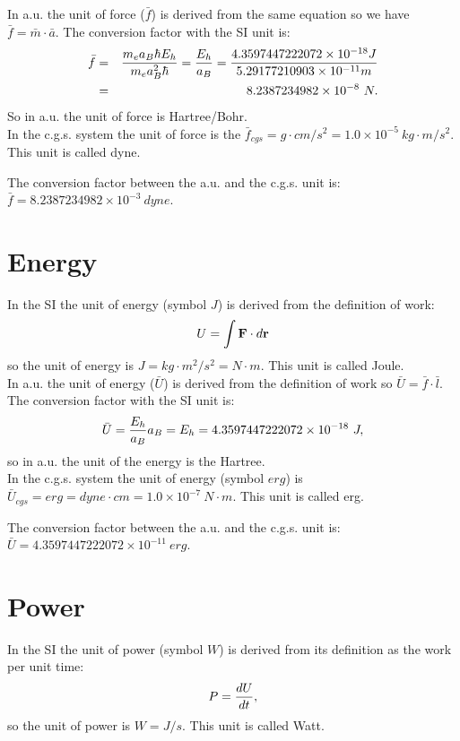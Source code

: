 \documentclass[12pt,a4paper]{article}
\def\barl{5.29177210903\times 10^{-11}}
\def\barf{8.2387234982\times 10^{-8}}
\def\baru{4.3597447222072\times 10^{-18}}
\def\ftof{1.0\times 10^{-5}}
\def\utou{1.0\times 10^{-7}}
\def\barfcgs{8.2387234982\times 10^{-3}}
\def\barucgs{4.3597447222072\times 10^{-11}}
\begin{document}
{\color{web-blue} In a.u. the unit of force ($\bar f$) is derived 
from the same equation so we have $\bar f =\bar m \cdot \bar a$. The
conversion factor with the SI unit is: 
\begin{eqnarray}
\bar f &=& {m_e a_B \hbar E_h \over m_e a_B^2 \hbar }= 
{E_h\over a_B}\nonumber={\baru J \over \barl m}\nonumber \\
&=&\barf\ N. 
\end{eqnarray}
So in a.u. the unit of force is Hartree/Bohr.
}
\\

{\color{orange} In the c.g.s. system the unit of force is the 
$\bar f_{cgs}=g\cdot cm/s^2 = \ftof\ kg\cdot m/s^2$. This unit is 
called dyne.
\\
}

{\color{green} The conversion factor between the a.u. and the c.g.s. unit is:
$\bar f=\barfcgs\ dyne$.
\\
}
\newpage

\section{\color{coral}Energy}
In the SI the unit of energy (symbol $J$) is derived from the 
definition of work: 
\begin{equation}
U= \int {\bf F} \cdot d{\bf r}
\end{equation} 
so the unit of energy is $J=kg\cdot m^2/s^2=N\cdot m$. This unit is 
called Joule.
\\

{\color{web-blue} In a.u. the unit of energy ($\bar U$) is derived 
from the definition of work so $\bar U =\bar f \cdot \bar l$. The 
conversion factor with the SI unit is: 
\begin{equation}
\bar U = {E_h\over a_B} a_B=E_h=\baru\ J, 
\end{equation}
so in a.u. the unit of the energy is the Hartree.
}
\\

{\color{orange} In the c.g.s. system the unit of energy (symbol $erg$)
is $\bar U_{cgs}=erg=dyne\cdot cm = \utou\ N\cdot m$. This unit is 
called erg.
\\
}

{\color{green} The conversion factor between the a.u. and the c.g.s. unit is:
$\bar U=\barucgs\ erg$.
\\
}

\newpage
\section{\color{coral}Power}
In the SI the unit of power (symbol $W$) is derived from its
definition as the work per unit time: 
\begin{equation}
P= {d U \over d t},
\end{equation} 
so the unit of power is $W=J/s$. This unit is called Watt.
\\
\end{document}
